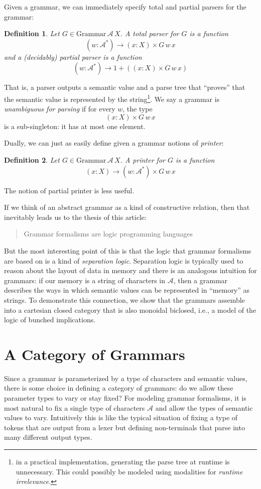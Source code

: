 \documentclass[12pt]{article}
\newcommand{\Grammar}{\textrm{Grammar}}
\newtheorem{definition}{Definition}
\begin{document}
Given a grammar, we can immediately specify total and partial parsers for the grammar:
\begin{definition}
  Let $G \in \Grammar\,{\mathcal A}\,X$. A \emph{total parser} for $G$ is a function
  \[ (w:\mathcal A^*) \to (x: X) \times G\,w\,x\]
  and a (decidably) \emph{partial parser} is a function
  \[ (w : \mathcal A^*) \to 1 + ((x: X) \times G\,w\,x)\]
\end{definition}
That is, a parser outputs a semantic value and a parse tree that
``proves'' that the semantic value is represented by the
string\footnote{in a practical implementation, generating the parse
tree at runtime is unnecessary. This could possibly be modeled using
modalities for \emph{runtime irrelevance}.}. We say a grammar is
\emph{unambiguous for parsing} if for every $w$, the type
\[ (x: X) \times G\,w\,x \]
is a sub-singleton: it has at most one element.

Dually, we can just as easily define given a grammar notions of \emph{printer}:
\begin{definition}
  Let $G \in \Grammar\,{\mathcal A}\,X$. A \emph{printer} for $G$ is a function
  \[ (x : X) \to (w : \mathcal A^*) \times G\,w\,x \]
\end{definition}
The notion of partial printer is less useful.

If we think of an abstract grammar as a kind of constructive relation,
then that inevitably leads us to the thesis of this article:
\begin{quote}
  Grammar formalisms are logic programming languages
\end{quote}
But the most interesting point of this is that the logic that grammar
formalisms are based on is a kind of \emph{separation
logic}. Separation logic is typically used to reason about the layout
of data in memory and there is an analogous intuition for grammars: if
our memory is a string of characters in $\mathcal A$, then a grammar
describes the ways in which semantic values can be represented in
``memory'' as strings. To demonstrate this connection, we show that
the grammars assemble into a cartesian closed category that is also
monoidal biclosed, i.e., a model of the logic of bunched implications.

\section{A Category of Grammars}

Since a grammar is parameterized by a type of characters and semantic
values, there is some choice in defining a category of grammars: do we
allow these parameter types to vary or stay fixed? For modeling
grammar formalisms, it is most natural to fix a single type of
characters $\mathcal A$ and allow the types of semantic values to
vary. Intuitively this is like the typical situation of fixing a type
of tokens that are output from a lexer but defining non-terminals that
parse into many different output types.
\end{document}

